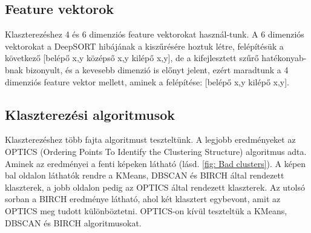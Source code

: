 \documentclass[12pt,a4paper]{article}
\begin{document}
\subsection{Feature vektorok}
Klaszterezéshez 4 és 6 dimenziós feature vektorokat használ-tunk. A 6 dimenziós vektorokat a DeepSORT hibájának a kiszűrésére hoztuk létre, felépítésük a következő [belépő x,y középső x,y kilépő x,y], de a kifejlesztett szűrő hatékonyab-bnak bizonyult, és a kevesebb dimenzió is előnyt jelent, ezért maradtunk a 4 dimenziós feature vektor mellett, aminek a felépítése: [belépő x,y kilépő x,y].
\subsection{Klaszterezési algoritmusok}
Klaszterezéshez több fajta algoritmust teszteltünk. A legjobb eredményeket az OPTICS (Ordering Points To Identify the Clustering Structure) \cite{10.1145/304181.304187} algoritmus adta.
Aminek az eredményei a fenti képeken látható (lásd. \ref{fig: Bad clusters}). A képen bal oldalon láthatók rendre a KMeans, DBSCAN és BIRCH által rendezett klaszterek, a jobb oldalon pedig az OPTICS által rendezett klaszterek. Az utolsó sorban a BIRCH eredménye látható, ahol két klasztert egybevont, amit az OPTICS meg tudott különböztetni.
OPTICS-on kívül teszteltük a KMeans, DBSCAN és BIRCH algoritmusokat.
\end{document}
